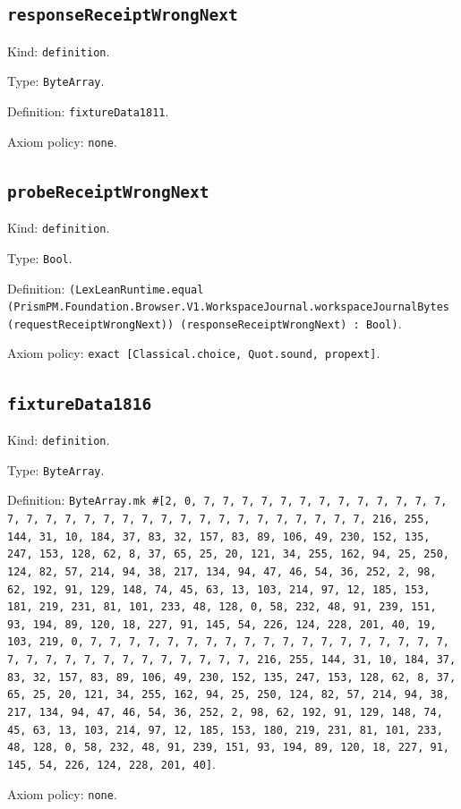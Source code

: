 \documentclass[11pt]{article}
\begin{document}
\subsection*{\texttt{responseReceiptWrongNext}}
\noindent Kind: \texttt{definition}.\par
\noindent Type: \texttt{ByteArray}.\par
\noindent Definition: \texttt{fixtureData1811}.\par
\noindent Axiom policy: \texttt{none}.\par
\subsection*{\texttt{probeReceiptWrongNext}}
\noindent Kind: \texttt{definition}.\par
\noindent Type: \texttt{Bool}.\par
\noindent Definition: \texttt{(LexLeanRuntime.equal (PrismPM.Foundation.Browser.V1.WorkspaceJournal.workspaceJournalBytes (requestReceiptWrongNext)) (responseReceiptWrongNext) : Bool)}.\par
\noindent Axiom policy: \texttt{exact [Classical.choice, Quot.sound, propext]}.\par
\subsection*{\texttt{fixtureData1816}}
\noindent Kind: \texttt{definition}.\par
\noindent Type: \texttt{ByteArray}.\par
\noindent Definition: \texttt{ByteArray.mk \#[2, 0, 7, 7, 7, 7, 7, 7, 7, 7, 7, 7, 7, 7, 7, 7, 7, 7, 7, 7, 7, 7, 7, 7, 7, 7, 7, 7, 7, 7, 7, 7, 7, 7, 216, 255, 144, 31, 10, 184, 37, 83, 32, 157, 83, 89, 106, 49, 230, 152, 135, 247, 153, 128, 62, 8, 37, 65, 25, 20, 121, 34, 255, 162, 94, 25, 250, 124, 82, 57, 214, 94, 38, 217, 134, 94, 47, 46, 54, 36, 252, 2, 98, 62, 192, 91, 129, 148, 74, 45, 63, 13, 103, 214, 97, 12, 185, 153, 181, 219, 231, 81, 101, 233, 48, 128, 0, 58, 232, 48, 91, 239, 151, 93, 194, 89, 120, 18, 227, 91, 145, 54, 226, 124, 228, 201, 40, 19, 103, 219, 0, 7, 7, 7, 7, 7, 7, 7, 7, 7, 7, 7, 7, 7, 7, 7, 7, 7, 7, 7, 7, 7, 7, 7, 7, 7, 7, 7, 7, 7, 7, 7, 7, 216, 255, 144, 31, 10, 184, 37, 83, 32, 157, 83, 89, 106, 49, 230, 152, 135, 247, 153, 128, 62, 8, 37, 65, 25, 20, 121, 34, 255, 162, 94, 25, 250, 124, 82, 57, 214, 94, 38, 217, 134, 94, 47, 46, 54, 36, 252, 2, 98, 62, 192, 91, 129, 148, 74, 45, 63, 13, 103, 214, 97, 12, 185, 153, 180, 219, 231, 81, 101, 233, 48, 128, 0, 58, 232, 48, 91, 239, 151, 93, 194, 89, 120, 18, 227, 91, 145, 54, 226, 124, 228, 201, 40]}.\par
\noindent Axiom policy: \texttt{none}.\par
\end{document}
